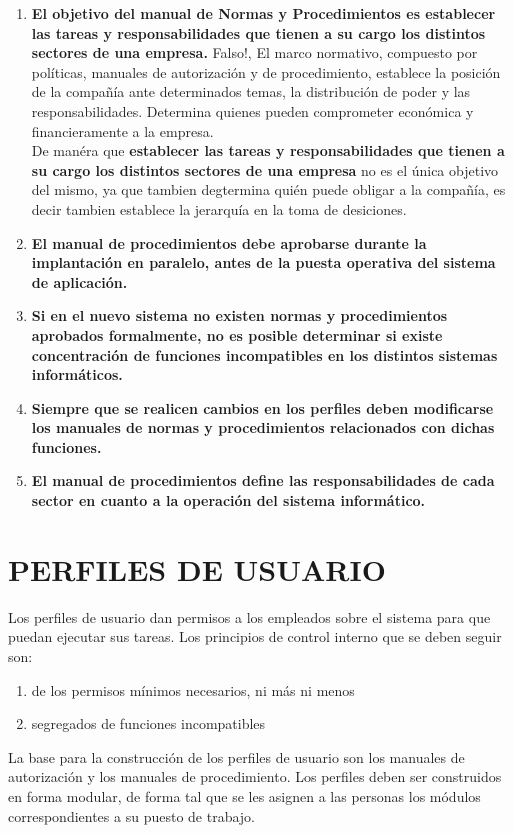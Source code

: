 \documentclass[12pt]{book}
\begin{document}
\begin{enumerate}
	\item 	\textbf{El objetivo del manual de Normas y Procedimientos es establecer las tareas y responsabilidades 	que	tienen a su cargo los distintos sectores de una empresa.}
Falso!,
El marco normativo, compuesto por políticas, manuales de autorización y de procedimiento, establece la posición de la compañía ante determinados temas, la distribución de poder y las responsabilidades. Determina quienes pueden comprometer económica y financieramente a la empresa.		\\
De manéra que \textbf{establecer las tareas y responsabilidades 	que	tienen a su cargo los distintos sectores de una empresa} no es el única objetivo del mismo, ya que tambien degtermina quién puede obligar a la compañía, es decir tambien establece la jerarquía en la toma de desiciones.
	
	\item \textbf{El manual de procedimientos debe aprobarse durante la implantación en paralelo, antes de 				la 	puesta 	operativa del sistema de aplicación.}
	
	\item \textbf{Si en el nuevo sistema no existen normas y procedimientos aprobados formalmente, no es 			posible	determinar si existe concentración de funciones incompatibles en los distintos sistemas informáticos.}
	
	
	\item \textbf{	Siempre que se realicen cambios en los perfiles deben modificarse los manuales de normas 		y procedimientos relacionados con dichas funciones.}	
	
	
	\item \textbf{El manual de procedimientos define las responsabilidades de cada sector en cuanto a la 				operación 		del	sistema informático.}
	
	
\end{enumerate}



\chapter{PERFILES DE USUARIO}

Los perfiles de usuario dan permisos a los empleados sobre el sistema para que puedan ejecutar sus tareas. Los principios
de control interno que se deben seguir son:
\begin{enumerate}
	\item de los permisos mínimos necesarios, ni más ni menos
	\item segregados de funciones incompatibles
\end{enumerate}
La base para la construcción de los perfiles de usuario son los manuales de autorización y los manuales de procedimiento.
Los perfiles deben ser construidos en forma modular, de forma tal que se les asignen a las personas los módulos correspondientes a su puesto de trabajo.
\end{document}

